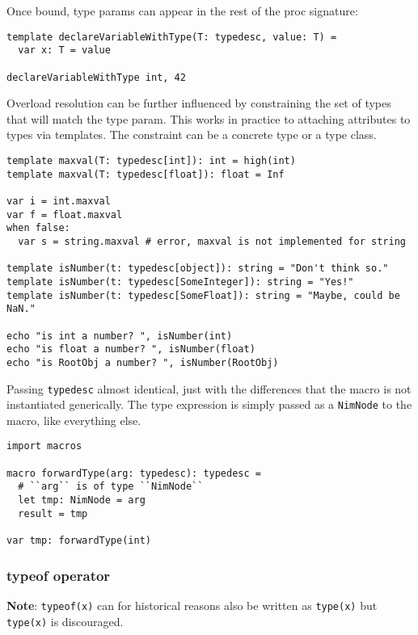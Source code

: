 Once bound, type params can appear in the rest of the proc signature:

\begin{verbatim}
template declareVariableWithType(T: typedesc, value: T) =
  var x: T = value

declareVariableWithType int, 42
\end{verbatim}

Overload resolution can be further influenced by constraining the set of
types that will match the type param. This works in practice to
attaching attributes to types via templates. The constraint can be a
concrete type or a type class.

\begin{verbatim}
template maxval(T: typedesc[int]): int = high(int)
template maxval(T: typedesc[float]): float = Inf

var i = int.maxval
var f = float.maxval
when false:
  var s = string.maxval # error, maxval is not implemented for string

template isNumber(t: typedesc[object]): string = "Don't think so."
template isNumber(t: typedesc[SomeInteger]): string = "Yes!"
template isNumber(t: typedesc[SomeFloat]): string = "Maybe, could be NaN."

echo "is int a number? ", isNumber(int)
echo "is float a number? ", isNumber(float)
echo "is RootObj a number? ", isNumber(RootObj)
\end{verbatim}

Passing \texttt{typedesc} almost identical, just with the differences
that the macro is not instantiated generically. The type expression is
simply passed as a \texttt{NimNode} to the macro, like everything else.

\begin{verbatim}
import macros

macro forwardType(arg: typedesc): typedesc =
  # ``arg`` is of type ``NimNode``
  let tmp: NimNode = arg
  result = tmp

var tmp: forwardType(int)
\end{verbatim}

\hypertarget{typeof-operator}{%
\subsubsection{typeof operator}\label{typeof-operator}}

\textbf{Note}: \texttt{typeof(x)} can for historical reasons also be
written as \texttt{type(x)} but \texttt{type(x)} is discouraged.


